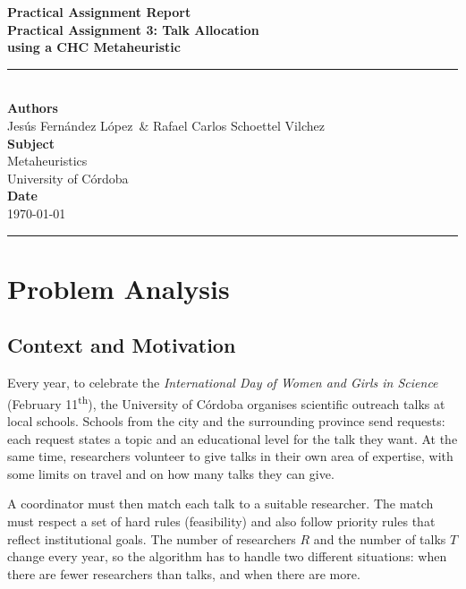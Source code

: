 \documentclass[12pt, a4paper]{article}
\newcommand{\reporttitle}{Practical Assignment 3: Talk Allocation\\[0.3cm]
\large using a CHC Metaheuristic}
\newcommand{\reportdate}{\today}
\newcommand{\authorA}{Jesús Fernández López}
\newcommand{\authorB}{Rafael Carlos Schoettel Vilchez}
\begin{document}
\begin{titlepage}
  \centering
  \vspace*{3cm}
  {\Huge \textbf{Practical Assignment Report}}\\[0.8cm]
  {\LARGE \textbf{\reporttitle}}\\[0.5cm]
  \rule{\textwidth}{0.4pt}\\[2cm]
  {\Large \textbf{Authors}}\\[0.4cm]
  {\large \authorA\ \& \authorB}\\[1.5cm]
  {\Large \textbf{Subject}}\\[0.4cm]
  {\large Metaheuristics}\\[0.4cm]
  {\normalsize University of Córdoba}\\[1.5cm]
  {\Large \textbf{Date}}\\[0.4cm]
  {\large \reportdate}
  \vfill
  \rule{\textwidth}{0.4pt}
\end{titlepage}

\newpage
\tableofcontents
\newpage

\section{Problem Analysis}

\subsection{Context and Motivation}

Every year, to celebrate the \textit{International Day of Women and Girls in Science}
(February 11\textsuperscript{th}), the University of Córdoba organises scientific
outreach talks at local schools. Schools from the city and the surrounding province
send requests: each request states a topic and an educational level for the talk
they want. At the same time, researchers volunteer to give talks in their own area
of expertise, with some limits on travel and on how many talks they can give.

A coordinator must then match each talk to a suitable researcher. The match must
respect a set of hard rules (feasibility) and also follow priority rules that reflect
institutional goals. The number of researchers $R$ and the number of talks $T$ change
every year, so the algorithm has to handle two different situations: when there are
fewer researchers than talks, and when there are more.
\end{document}
